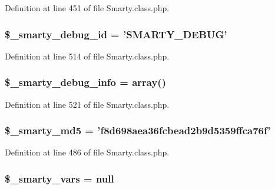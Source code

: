 \-Definition at line 451 of file \-Smarty.\-class.\-php.

\hypertarget{class_smarty_a39de745821c96537c5f36d79120e1413}{
\subsubsection[{\$\-\_\-smarty\-\_\-debug\-\_\-id}]{\setlength{\rightskip}{0pt plus 5cm}\$\-\_\-smarty\-\_\-debug\-\_\-id = '\-S\-M\-A\-R\-T\-Y\-\_\-\-D\-E\-B\-U\-G'}}\label{class_smarty_a39de745821c96537c5f36d79120e1413}


\-Definition at line 514 of file \-Smarty.\-class.\-php.

\hypertarget{class_smarty_a751873e7923220e5351800cc29fef3b3}{
\subsubsection[{\$\-\_\-smarty\-\_\-debug\-\_\-info}]{\setlength{\rightskip}{0pt plus 5cm}\$\-\_\-smarty\-\_\-debug\-\_\-info = array()}}\label{class_smarty_a751873e7923220e5351800cc29fef3b3}


\-Definition at line 521 of file \-Smarty.\-class.\-php.

\hypertarget{class_smarty_a215c18c7e01e94ff276e0e7249bfd38d}{
\subsubsection[{\$\-\_\-smarty\-\_\-md5}]{\setlength{\rightskip}{0pt plus 5cm}\$\-\_\-smarty\-\_\-md5 = 'f8d698aea36fcbead2b9d5359ffca76f'}}\label{class_smarty_a215c18c7e01e94ff276e0e7249bfd38d}


\-Definition at line 486 of file \-Smarty.\-class.\-php.

\hypertarget{class_smarty_a8b74cd5266386c9651f86d02b4bf3bc4}{
\subsubsection[{\$\-\_\-smarty\-\_\-vars}]{\setlength{\rightskip}{0pt plus 5cm}\$\-\_\-smarty\-\_\-vars = null}}\label{class_smarty_a8b74cd5266386c9651f86d02b4bf3bc4}


